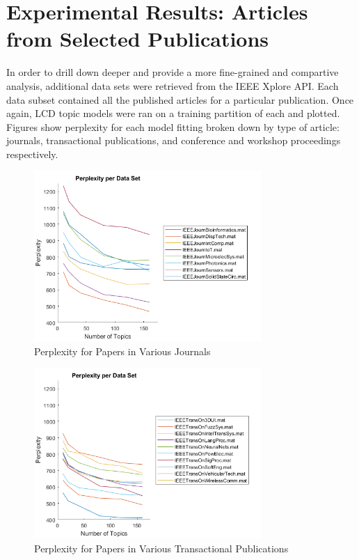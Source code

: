 \documentclass[conference]{IEEEtran}
\begin{document}
\section{Experimental Results: Articles from Selected Publications}

In order to drill down deeper and provide a more fine-grained and compartive analysis, additional data sets were retrieved from the IEEE Xplore API. Each data subset contained all the published articles for a particular publication. Once again, LCD topic models were ran on a training partition of each and plotted. Figures show perplexity for each model fitting broken down by type of article: journals, transactional publications, and conference and workshop proceedings respectively.

\begin{figure}
	\centering
	\includegraphics[width=3.4in]{journ_ppl.png}
	\caption{Perplexity for Papers in Various Journals}
	\label{fig:journ_ppl}
\end{figure}

\begin{figure}
	\centering
	\includegraphics[width=3.4in]{trans_ppl.png}
	\caption{Perplexity for Papers in Various Transactional Publications}
	\label{fig:trans_ppl}
\end{figure}
\end{document}
